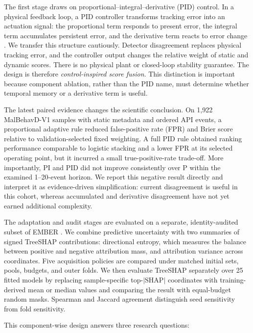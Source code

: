 The first stage draws on proportional--integral--derivative (PID) control. In a
physical feedback loop, a PID controller transforms tracking error into an
actuation signal: the proportional term responds to present error, the integral
term accumulates persistent error, and the derivative term reacts to error
change \cite{astrom2001future}. We transfer this structure cautiously. Detector
disagreement replaces physical tracking error, and the controller output changes
the relative weight of static and dynamic scores. There is no physical plant or
closed-loop stability guarantee. The design is therefore \emph{control-inspired
score fusion}. This distinction is important because component ablation, rather
than the PID name, must determine whether temporal memory or a derivative term is
useful.

The latest paired evidence changes the scientific conclusion. On 1,922
MalBehavD-V1 samples with static metadata and ordered API events, a proportional
adaptive rule reduced false-positive rate (FPR) and Brier score relative to
validation-selected fixed weighting. A full PID rule obtained ranking
performance comparable to logistic stacking and a lower FPR at its selected
operating point, but it incurred a small true-positive-rate trade-off. More
importantly, PI and PID did not improve consistently over P within the examined
1--20-event horizon. We report this negative result directly and interpret it as
evidence-driven simplification: current disagreement is useful in this cohort,
whereas accumulated and derivative disagreement have not yet earned additional
complexity.

The adaptation and audit stages are evaluated on a separate, identity-audited
subset of EMBER \cite{anderson2018ember}. We combine predictive uncertainty with
two summaries of signed TreeSHAP contributions: directional entropy, which
measures the balance between positive and negative attribution mass, and
attribution variance across coordinates. Five acquisition policies are compared
under matched initial sets, pools, budgets, and outer folds. We then evaluate
TreeSHAP separately over 25 fitted models by replacing sample-specific
top-$|\mathrm{SHAP}|$ coordinates with training-derived mean or median values and
comparing the result with equal-budget random masks. Spearman and Jaccard
agreement distinguish seed sensitivity from fold sensitivity.

This component-wise design answers three research questions:

